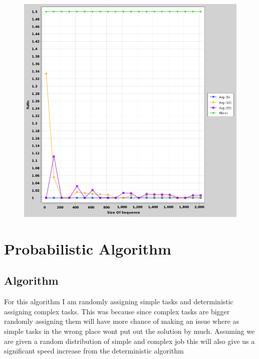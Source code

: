 \documentclass{article}
\begin{document}
			\begin{figure}[h]
				\vspace{3mm}
				\begin{center}
					\includegraphics[scale=0.4]{Approx.png}
				\end{center}
			\end{figure}
		
		
	\section{Probabilistic Algorithm}				
		\subsection{Algorithm}
			For this algorithm I am randomly assigning simple tasks and deterministic assigning complex tasks. This was because since complex tasks are bigger randomly assigning them will have more chance of making an issue where as simple tasks in the wrong place wont put out the solution by much. Assuming we are given a random distribution of simple and complex job this will also give us a significant speed increase from the deterministic algorithm\newline
		
\end{document}
